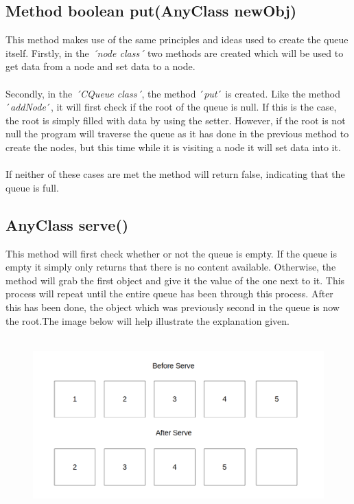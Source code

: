 \documentclass[12pt]{article}
\begin{document}
\subsection{Method boolean put(AnyClass newObj)}
This method makes use of the same principles and ideas used to create the queue itself. Firstly, in the \emph{´node class´} two methods are created which will be used to get data from a node and set data to a node.\\
\\Secondly, in the \emph{´CQueue class´}, the method ´\emph{put}´ is created. Like the method ´\emph{addNode}´, it will first check if the root of the queue is null. If this is the case, the root is simply filled with data by using the setter. However, if the root is not null the program will traverse the queue as it has done in the previous method to create the nodes, but this time while it is visiting a node it will set data into it.\\
\\If neither of these cases are met the method will return false, indicating that the queue is full.
\bigskip

\subsection{AnyClass serve()}
This method will first check whether or not the queue is empty. If the queue is empty it simply only returns that there is no content available. Otherwise, the method will grab the first object and give it the value of the one next to it. This process will repeat until the entire queue has been through this process. After this has been done, the object which was previously second in the queue is now the root.The image below will help illustrate the explanation given.\\
\\
\begin{figure}[h]
\centering
\includegraphics[scale=0.30]{Images/serve.png}
\end{figure}
\bigskip
\end{document}
